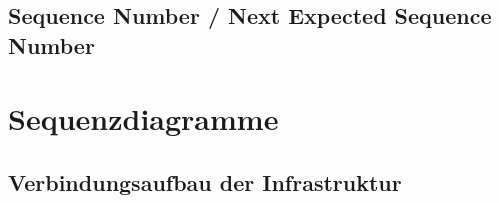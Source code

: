 \documentclass[doktyp=barbeit]{TUBAFarbeiten}
\begin{document}
	\subsection{Sequence Number / Next Expected Sequence Number}
		\label{sec: anhang nesn sn}
		

\section{Sequenzdiagramme}
	\subsection{Verbindungsaufbau der Infrastruktur}
		\label{sec: anhang infra verb aufbau}
		
\end{document}
